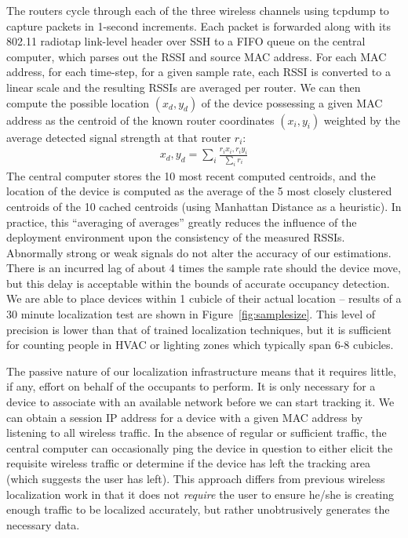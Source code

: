 The routers cycle through each of the three wireless channels using tcpdump to capture packets in 1-second increments. Each packet is forwarded along with its 802.11 radiotap link-level header over SSH to a FIFO queue on the central computer, which parses out the RSSI and source MAC address. For each MAC address, for each time-step, for a given sample rate, each RSSI is converted to a linear scale and the resulting RSSIs are averaged per router. We can then compute the possible location $(x_d,y_d)$ of the device possessing a given MAC address as the centroid of the known router coordinates $(x_i, y_i)$ weighted by the average detected signal strength at that router $r_i$:
\begin{equation}
\begin{split}
x_d, y_d = \displaystyle\sum_{i} \frac{r_ix_i, r_iy_i}{\displaystyle\sum_i r_i}
\end{split}
\end{equation}
The central computer stores the 10 most recent computed centroids, and the location of the device is computed as the average of the 5 most closely clustered centroids of the 10 cached centroids (using Manhattan Distance as a heuristic). In practice, this ``averaging of averages'' greatly reduces the influence of the deployment environment upon the consistency of the measured RSSIs. Abnormally strong or weak signals do not alter the accuracy of our estimations. There is an incurred lag of about 4 times the sample rate should the device move, but this delay is acceptable within the bounds of accurate occupancy detection. We are able to place devices within 1 cubicle of their actual location -- results of a 30 minute localization test are shown in Figure~\ref{fig:samplesize}. This level of precision is lower than that of trained localization techniques, but it is sufficient for counting people in HVAC or lighting zones which typically span 6-8 cubicles.

The passive nature of our localization infrastructure means that it requires little, if any, effort on behalf of the occupants to perform. It is only necessary for a device to associate with an available network before we can start tracking it. We can obtain a session IP address for a device with a given MAC address by listening to all wireless traffic. In the absence of regular or sufficient traffic, the central computer can occasionally ping the device in question to either elicit the requisite wireless traffic or determine if the device has left the tracking area (which suggests the user has left). This approach differs from previous wireless localization work in that it does not \emph{require} the user to ensure he/she is creating enough traffic to be localized accurately, but rather unobtrusively generates the necessary data. 

